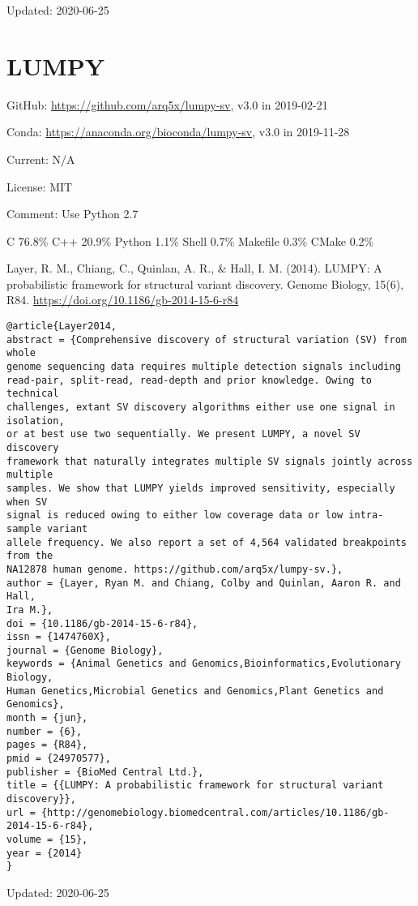 \documentclass[]{article}
\begin{document}
Updated: 2020-06-25

\section{LUMPY}

GitHub: \url{https://github.com/arq5x/lumpy-sv}, v3.0 in 2019-02-21

Conda: \url{https://anaconda.org/bioconda/lumpy-sv}, v3.0 in 2019-11-28

Current: N/A

License: MIT

Comment: Use Python 2.7

C 76.8\% C++ 20.9\% Python 1.1\% Shell 0.7\% Makefile 0.3\% CMake 0.2\%

Layer, R. M., Chiang, C., Quinlan, A. R., \& Hall, I. M. (2014). LUMPY: A probabilistic framework for structural variant discovery. Genome Biology, 15(6), R84. \url{https://doi.org/10.1186/gb-2014-15-6-r84}

\begin{verbatim}
@article{Layer2014,
abstract = {Comprehensive discovery of structural variation (SV) from whole
genome sequencing data requires multiple detection signals including
read-pair, split-read, read-depth and prior knowledge. Owing to technical
challenges, extant SV discovery algorithms either use one signal in isolation,
or at best use two sequentially. We present LUMPY, a novel SV discovery
framework that naturally integrates multiple SV signals jointly across multiple
samples. We show that LUMPY yields improved sensitivity, especially when SV
signal is reduced owing to either low coverage data or low intra-sample variant
allele frequency. We also report a set of 4,564 validated breakpoints from the
NA12878 human genome. https://github.com/arq5x/lumpy-sv.},
author = {Layer, Ryan M. and Chiang, Colby and Quinlan, Aaron R. and Hall,
Ira M.},
doi = {10.1186/gb-2014-15-6-r84},
issn = {1474760X},
journal = {Genome Biology},
keywords = {Animal Genetics and Genomics,Bioinformatics,Evolutionary Biology,
Human Genetics,Microbial Genetics and Genomics,Plant Genetics and Genomics},
month = {jun},
number = {6},
pages = {R84},
pmid = {24970577},
publisher = {BioMed Central Ltd.},
title = {{LUMPY: A probabilistic framework for structural variant discovery}},
url = {http://genomebiology.biomedcentral.com/articles/10.1186/gb-2014-15-6-r84},
volume = {15},
year = {2014}
}
\end{verbatim}

Updated: 2020-06-25
\end{document}
